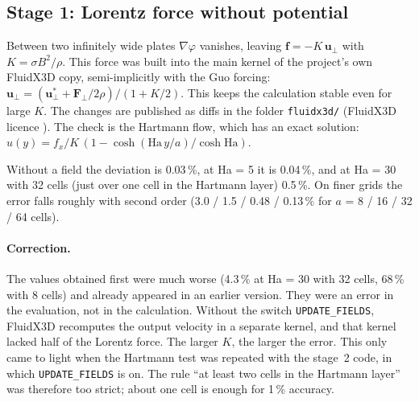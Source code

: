 \subsection*{Stage 1: Lorentz force without potential}
Between two infinitely wide plates $\nabla\varphi$ vanishes, leaving $\mathbf{f} = -K\,\mathbf{u}_\perp$ with
$K = \sigma B^2/\rho$. This force was built into the main kernel of the project's own FluidX3D copy, semi-implicitly
with the Guo forcing: $\mathbf{u}_\perp = (\mathbf{u}^*_\perp + \mathbf{F}_\perp/2\rho)/(1+K/2)$. This keeps the
calculation stable even for large $K$. The changes are published as diffs in the folder \texttt{fluidx3d/}
(FluidX3D licence \cite{fluidx3d}). The check is the Hartmann flow, which has an exact solution:
$u(y) = f_x/K\,(1-\cosh(\mathrm{Ha}\,y/a)/\cosh\mathrm{Ha})$.


Without a field the deviation is 0.03\,\%, at Ha = 5 it is 0.04\,\%, and at Ha = 30 with 32 cells (just over one cell
in the Hartmann layer) 0.5\,\%. On finer grids the error falls roughly with second order (3.0 / 1.5 / 0.48 / 0.13\,\%
for $a$ = 8 / 16 / 32 / 64 cells).

\paragraph{Correction.} The values obtained first were much worse (4.3\,\% at Ha = 30 with 32 cells, 68\,\% with 8
cells) and already appeared in an earlier version. They were an error in the evaluation, not in the calculation.
Without the switch \texttt{UPDATE\_FIELDS}, FluidX3D recomputes the output velocity in a separate kernel, and that
kernel lacked half of the Lorentz force. The larger $K$, the larger the error. This only came to light when the
Hartmann test was repeated with the stage~2 code, in which \texttt{UPDATE\_FIELDS} is on. The rule ``at least two
cells in the Hartmann layer'' was therefore too strict; about one cell is enough for 1\,\% accuracy.

